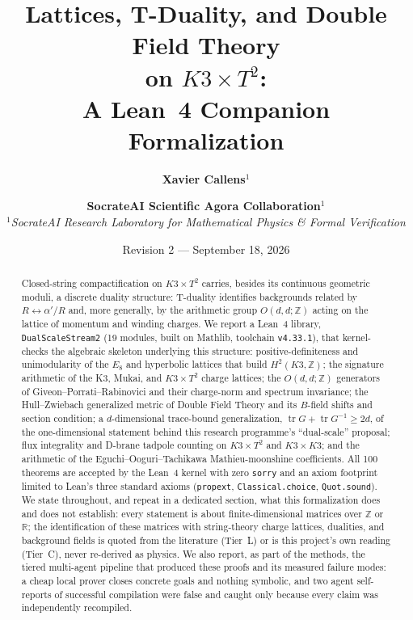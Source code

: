 \documentclass[11pt,a4paper]{article}
\title{\Huge \textbf{Lattices, T-Duality, and Double Field Theory}\\[0.3em]
\LARGE \textbf{on $K3\times T^2$:}\\[0.2em]
A Lean~4 Companion Formalization}
\author{\textbf{Xavier Callens}$^{1}$ \and \textbf{SocrateAI Scientific Agora Collaboration}$^{1}$ \\[0.5em]
$^{1}$\textit{SocrateAI Research Laboratory for Mathematical Physics \& Formal Verification}}
\date{Revision 2 --- September 18, 2026}
\theoremstyle{remark}
\begin{document}
\maketitle

\begin{abstract}
Closed-string compactification on $K3\times T^2$ carries, besides its continuous geometric
moduli, a discrete duality structure: T-duality identifies backgrounds related by
$R\leftrightarrow \alpha'/R$ and, more generally, by the arithmetic group $O(d,d;\mathbb{Z})$
acting on the lattice of momentum and winding charges. We report a Lean~4 library,
\texttt{DualScaleStream2} (19 modules, built on Mathlib, toolchain \texttt{v4.33.1}), that
kernel-checks the algebraic skeleton underlying this structure: positive-definiteness and
unimodularity of the $E_8$ and hyperbolic lattices that build $H^2(K3,\mathbb{Z})$; the
signature arithmetic of the K3, Mukai, and $K3\times T^2$ charge lattices; the $O(d,d;\mathbb{Z})$
generators of Giveon--Porrati--Rabinovici and their charge-norm and spectrum invariance; the
Hull--Zwiebach generalized metric of Double Field Theory and its $B$-field shifts and section
condition; a $d$-dimensional trace-bound generalization, $\operatorname{tr}G+\operatorname{tr}G^{-1}\ge 2d$,
of the one-dimensional statement behind this research programme's ``dual-scale'' proposal; flux
integrality and D-brane tadpole counting on $K3\times T^2$ and $K3\times K3$; and the arithmetic
of the Eguchi--Ooguri--Tachikawa Mathieu-moonshine coefficients. All 100 theorems are accepted by
the Lean~4 kernel with zero \texttt{sorry} and an axiom footprint limited to Lean's three
standard axioms (\texttt{propext}, \texttt{Classical.choice}, \texttt{Quot.sound}). We state
throughout, and repeat in a dedicated section, what this formalization does and does not
establish: every statement is about finite-dimensional matrices over $\mathbb{Z}$ or $\mathbb{R}$;
the identification of these matrices with string-theory charge lattices, dualities, and
background fields is quoted from the literature (Tier~L) or is this project's own reading
(Tier~C), never re-derived as physics. We also report, as part of the methods, the tiered
multi-agent pipeline that produced these proofs and its measured failure modes: a cheap local
prover closes concrete goals and nothing symbolic, and two agent self-reports of successful
compilation were false and caught only because every claim was independently recompiled.
\end{abstract}

\newpage
\tableofcontents
\newpage
\end{document}
